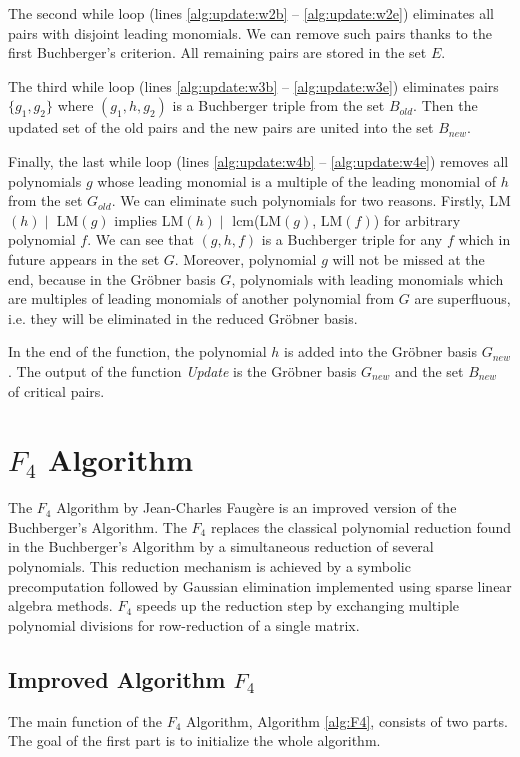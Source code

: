 The second while loop (lines \ref{alg:update:w2b} -- \ref{alg:update:w2e}) eliminates all pairs with disjoint leading monomials. We can remove such pairs thanks to the first Buchberger's criterion. All remaining pairs are stored in the set $E$.

The third while loop (lines \ref{alg:update:w3b} -- \ref{alg:update:w3e}) eliminates pairs $\{g_1, g_2\}$ where $(g_1, h, g_2)$ is a Buchberger triple from the set $B_{old}$. Then the updated set of the old pairs and the new pairs are united into the set $B_{new}$.

Finally, the last while loop (lines \ref{alg:update:w4b} -- \ref{alg:update:w4e}) removes all polynomials $g$ whose leading monomial is a multiple of the leading monomial of $h$ from the set $G_{old}$. We can eliminate such polynomials for two reasons. Firstly, LM$(h) \mid$ LM$(g)$ implies LM$(h) \mid$ lcm(LM$(g)$, LM$(f)$) for arbitrary polynomial $f$. We can see that $(g, h, f)$ is a Buchberger triple for any $f$ which in future appears in the set $G$. Moreover, polynomial $g$ will not be missed at the end, because in the Gr\"obner basis $G$, polynomials with leading monomials which are multiples of leading monomials of another polynomial from $G$ are superfluous, i.e. they will be eliminated in the reduced Gr\"obner basis.

In the end of the function, the polynomial $h$ is added into the Gr\"obner basis $G_{new}$. The output of the function \textit{Update} is the Gr\"obner basis $G_{new}$ and the set $B_{new}$ of critical pairs.



\section{$F_4$ Algorithm}
The $F_4$ Algorithm \cite{F4} by Jean-Charles Faug\`ere is an improved version of the Buchberger's Algorithm. The $F_4$ replaces the classical polynomial reduction found in the Buchberger's Algorithm by a simultaneous reduction of several polynomials. This reduction mechanism is achieved by a symbolic precomputation followed by Gaussian elimination implemented using sparse linear algebra methods. $F_4$ speeds up the reduction step by exchanging multiple polynomial divisions for row-reduction of a single matrix.

\subsection{Improved Algorithm $F_4$}
The main function of the $F_4$ Algorithm, Algorithm \ref{alg:F4}, consists of two parts. The goal of the first part is to initialize the whole algorithm.

